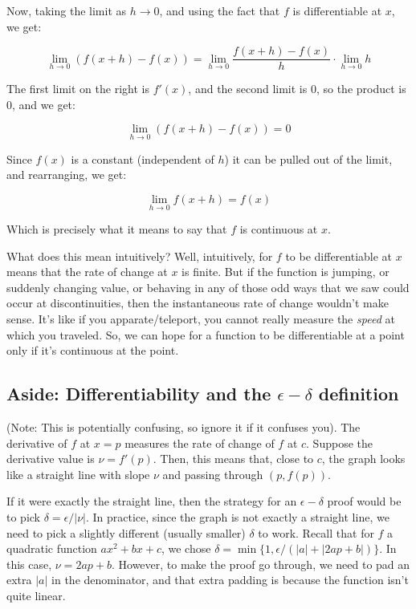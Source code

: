 \documentclass[10pt]{amsart}
\begin{document}
Now, taking the limit as $h \to 0$, and using the fact that $f$ is
differentiable at $x$, we get:

\begin{equation*}
  \lim_{h \to 0} (f(x + h) - f(x)) = \lim_{h \to 0} \frac{f(x + h) - f(x)}{h} \cdot \lim_{h \to 0} h
\end{equation*}

The first limit on the right is $f'(x)$, and the second limit is $0$,
so the product is $0$, and we get:

\begin{equation*}
  \lim_{h \to 0} (f(x + h) - f(x)) = 0
\end{equation*}

Since $f(x)$ is a constant (independent of $h$) it can be pulled out
of the limit, and rearranging, we get:

\begin{equation*}
  \lim_{h \to 0} f(x + h) = f(x)
\end{equation*}

Which is precisely what it means to say that $f$ is continuous at $x$.

What does this mean intuitively? Well, intuitively, for $f$ to be
differentiable at $x$ means that the rate of change at $x$ is
finite. But if the function is jumping, or suddenly changing value, or
behaving in any of those odd ways that we saw could occur at
discontinuities, then the instantaneous rate of change wouldn't make
sense. It's like if you apparate/teleport, you cannot really measure
the {\em speed} at which you traveled. So, we can hope for a function
to be differentiable at a point only if it's continuous at the point.

\subsection*{Aside: Differentiability and the $\epsilon-\delta$ definition}

(Note: This is potentially confusing, so ignore it if it confuses
you). The derivative of $f$ at $x = p$ measures the rate of change of
$f$ at $c$. Suppose the derivative value is $\nu = f'(p)$. Then, this
means that, close to $c$, the graph looks like a straight line with
slope $\nu$ and passing through $(p,f(p))$.

If it were exactly the straight line, then the strategy for an
$\epsilon-\delta$ proof would be to pick $\delta = \epsilon/|\nu|$. In
practice, since the graph is not exactly a straight line, we need to
pick a slightly different (usually smaller) $\delta$ to work. Recall
that for $f$ a quadratic function $ax^2 + bx + c$, we chose $\delta =
\min \{ 1, \epsilon/(|a| + |2ap + b|) \}$. In this case, $\nu = 2ap +
b$. However, to make the proof go through, we need to pad an extra
$|a|$ in the denominator, and that extra padding is because the
function isn't quite linear.
\end{document}
